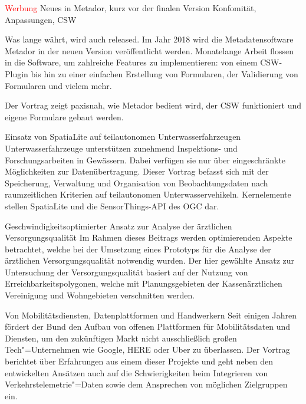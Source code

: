 \renewcommand{\conferenceDay}{\freitag}
\textcolor{red}{Werbung}
\newpage
{}
%
{Neues in Metador, kurz vor der finalen Version\vspace{0.2em}}%
{Konfomität, Anpassungen, CSW}%
{%
Was lange währt, wird auch released. Im Jahr 2018 wird die Metadatensoftware Metador
in der neuen Version veröffentlicht werden. Monatelange Arbeit flossen in
die Software, um zahlreiche Features zu implementieren: von einem CSW-Plugin
bis hin zu einer einfachen Erstellung von Formularen, der Validierung von
Formularen und vielem mehr.

Der Vortrag zeigt paxisnah, wie Metador bedient wird,
der CSW funktioniert und eigene Formulare gebaut werden.%
}

%
{Einsatz von SpatiaLite auf teil\-autonomen Unterwasserfahrzeugen}%
{}%
{%
Unterwasserfahrzeuge unterstützen zunehmend Inspek\-tions- und Forschungsarbeiten
in Gewässern. Dabei verfügen sie nur über eingeschränkte Möglichkeiten zur
Datenübertragung. Dieser Vortrag befasst sich mit der Speicherung, Verwaltung
und Organisation von Beobachtungsdaten nach raumzeitlichen Kriterien auf
teilautonomen Unterwasservehikeln. Kernelemente stellen SpatiaLite und
die SensorThings-API des OGC dar.%
}

%
{Geschwindigkeitsoptimierter Ansatz zur Analyse der ärztlichen \mbox{Versorgungsqualität}}%
{}%
{%
Im Rahmen dieses Beitrags werden optimierenden Aspekte betrachtet, welche bei
der Umsetzung eines Prototyps für die Analyse der ärztlichen
Versorgungsqualität notwendig wurden. Der hier gewählte Ansatz zur Untersuchung
der Versorgungsqualität basiert auf der Nutzung von Erreichbarkeitspolygonen,
welche mit Planungsgebieten der Kassenärztlichen Vereinigung und Wohngebieten
verschnitten werden.%
}

%
{Von Mobilitätsdiensten, \mbox{Datenplattformen} und Handwerkern}%
{}%
{%
Seit einigen Jahren fördert der Bund den Aufbau von offenen Plattformen für
Mobilitätsdaten und Diensten, um den zukünftigen Markt nicht ausschließlich großen
Tech"=Unternehmen wie Google, HERE oder Uber zu überlassen. Der Vortrag
berichtet über Erfahrungen aus einem dieser Projekte und geht neben den
entwickelten Ansätzen auch auf die Schwierigkeiten beim Integrieren von
Verkehrstelemetrie"=Daten sowie dem Ansprechen von möglichen Zielgruppen ein.%
}

